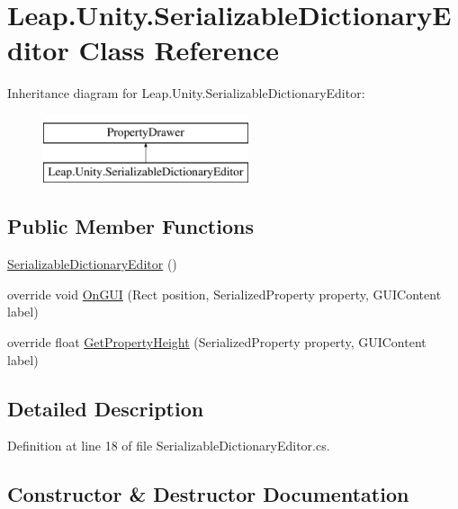 \hypertarget{class_leap_1_1_unity_1_1_serializable_dictionary_editor}{}\section{Leap.\+Unity.\+Serializable\+Dictionary\+Editor Class Reference}
\label{class_leap_1_1_unity_1_1_serializable_dictionary_editor}
Inheritance diagram for Leap.\+Unity.\+Serializable\+Dictionary\+Editor\+:\begin{figure}[H]
\begin{center}
\leavevmode
\includegraphics[height=2.000000cm]{class_leap_1_1_unity_1_1_serializable_dictionary_editor}
\end{center}
\end{figure}
\subsection*{Public Member Functions}
\begin{DoxyCompactItemize}
\item 
\mbox{\hyperlink{class_leap_1_1_unity_1_1_serializable_dictionary_editor_adb1f96f5edce4d91a0ed55a4a25712a1}{Serializable\+Dictionary\+Editor}} ()
\item 
override void \mbox{\hyperlink{class_leap_1_1_unity_1_1_serializable_dictionary_editor_ad60f559bff4eb2c058a9a356ded02bb7}{On\+G\+UI}} (Rect position, Serialized\+Property property, G\+U\+I\+Content label)
\item 
override float \mbox{\hyperlink{class_leap_1_1_unity_1_1_serializable_dictionary_editor_a7ba45bda36cd2ad85eec1b240f384976}{Get\+Property\+Height}} (Serialized\+Property property, G\+U\+I\+Content label)
\end{DoxyCompactItemize}


\subsection{Detailed Description}


Definition at line 18 of file Serializable\+Dictionary\+Editor.\+cs.



\subsection{Constructor \& Destructor Documentation}
\mbox{\label{class_leap_1_1_unity_1_1_serializable_dictionary_editor_adb1f96f5edce4d91a0ed55a4a25712a1}} 
